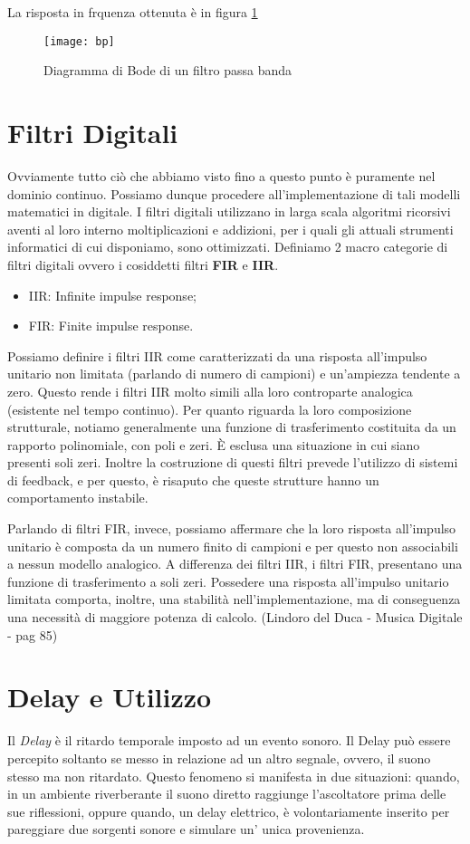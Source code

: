 La risposta in frquenza ottenuta è in figura \ref{fig:bp}
\begin{figure}[htp]
\centering
\texttt{[image: bp]}
\caption{Diagramma di Bode di un filtro passa banda}
\label{fig:bp}
\end{figure}


\section{Filtri Digitali}

Ovviamente tutto ciò che abbiamo visto fino a questo punto è puramente nel dominio continuo. Possiamo dunque procedere all’implementazione di tali modelli matematici in digitale. I filtri digitali utilizzano in larga scala algoritmi ricorsivi aventi al loro interno moltiplicazioni e addizioni, per i quali gli attuali strumenti informatici di cui disponiamo, sono ottimizzati. Definiamo 2 macro categorie di filtri digitali ovvero i cosiddetti filtri \textbf{FIR} e \textbf{IIR}.
\begin{itemize}
\item IIR: Infinite impulse response;
\item FIR: Finite impulse response.
\end{itemize}
Possiamo definire i filtri IIR come caratterizzati da una risposta all’impulso unitario non limitata (parlando di numero di campioni) e un’ampiezza tendente a zero.
Questo rende i filtri IIR molto simili alla loro controparte analogica (esistente nel tempo continuo).
Per quanto riguarda la loro composizione strutturale, notiamo generalmente una funzione di trasferimento costituita da un rapporto polinomiale, con poli e zeri. È esclusa una situazione in cui siano presenti soli zeri. Inoltre la costruzione di questi filtri prevede l’utilizzo di sistemi di feedback, e per questo, è risaputo che queste strutture hanno un comportamento instabile. 

Parlando di filtri FIR, invece, possiamo affermare che la loro risposta all’impulso unitario è composta da un numero finito di campioni e per questo non associabili a nessun modello analogico.
A differenza dei filtri IIR, i filtri FIR, presentano una funzione di trasferimento a soli zeri.
Possedere una risposta all’impulso unitario limitata comporta, inoltre, una stabilità nell'implementazione, ma di conseguenza una necessità di maggiore potenza di calcolo.
(Lindoro del Duca - Musica Digitale - pag 85)

\section{Delay e Utilizzo}
Il \emph{Delay} è il ritardo temporale imposto ad un evento sonoro. Il Delay può essere percepito soltanto se messo in relazione ad un altro segnale, ovvero, il suono stesso ma non ritardato.
Questo fenomeno si manifesta in due situazioni: quando, in un ambiente riverberante il suono diretto raggiunge l’ascoltatore prima delle sue riflessioni, oppure quando, un delay elettrico, è volontariamente inserito per pareggiare due sorgenti sonore e simulare un’ unica provenienza.

